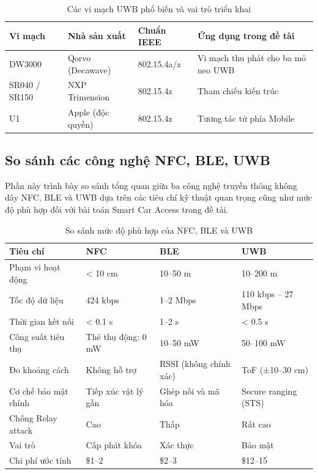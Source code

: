 \begin{table}[h]
\centering
\label{tab:uwb_chips}
\begin{tabular}{|l|l|l|l|}
\hline
\textbf{Vi mạch} & \textbf{Nhà sản xuất} & \textbf{Chuẩn IEEE} & \textbf{Ứng dụng trong đề tài} \\
\hline
DW3000 & Qorvo (Decawave) & 802.15.4a/z & Vi mạch thu phát cho ba mỏ neo UWB \\
SR040 / SR150 & NXP Trimension & 802.15.4z & Tham chiếu kiến trúc \\
U1 & Apple (độc quyền) & 802.15.4z & Tương tác từ phía Mobile \\
\hline
\end{tabular}
\caption{Các vi mạch UWB phổ biến và vai trò triển khai}
\end{table}


\subsection{So sánh các công nghệ NFC, BLE, UWB}

Phần này trình bày so sánh tổng quan giữa ba công nghệ truyền thông không dây NFC, BLE và UWB dựa trên các tiêu chí kỹ thuật quan trọng cũng như mức độ phù hợp đối với bài toán Smart Car Access trong đề tài.

\begin{table}[h]
\centering
\label{tab:wireless_comparison}
\begin{tabular}{|l|p{3.5cm}|p{4cm}|p{4cm}|}
\hline
\textbf{Tiêu chí} & \textbf{NFC} & \textbf{BLE} & \textbf{UWB} \\
\hline
Phạm vi hoạt động & < 10 cm & 10–50 m & 10–200 m \\
\hline
Tốc độ dữ liệu & 424 kbps & 1–2 Mbps & 110 kbps – 27 Mbps \\
\hline
Thời gian kết nối & < 0.1 s & 1–2 s & < 0.5 s \\
\hline
Công suất tiêu thụ & Thẻ thụ động: 0 mW & 10–50 mW & 50–100 mW \\
\hline
Đo khoảng cách & Không hỗ trợ & RSSI (không chính xác) & ToF (±10–30 cm) \\
\hline
Cơ chế bảo mật chính & Tiếp xúc vật lý gần & Ghép nối và mã hóa & Secure ranging (STS) \\
\hline
Chống Relay attack & Cao & Thấp & Rất cao  \\
\hline
Vai trò & Cấp phát khóa & Xác thực & Bảo mật \\
\hline
Chi phí ước tính & \$1–2 & \$2–3 & \$12–15 \\
\hline
\end{tabular}
\caption{So sánh mức độ phù hợp của NFC, BLE và UWB}
\end{table}


